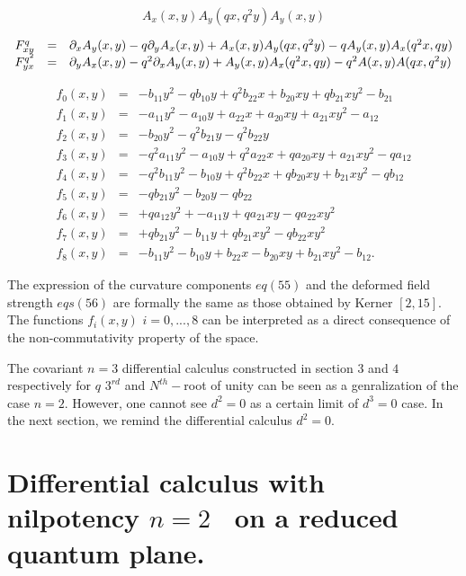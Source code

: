 \documentclass[a4paper,12pt,thmsa]{article}
\begin{document}
\[
A_x(x,y)A_y(qx,q^2y)A_y(x,y)
\]

\begin{equation}
\begin{array}{ccl}
F_{xy}^q &=&\partial _xA_y(x,y)-q\partial _yA_x(x,y)+
A_x(x,y)A_y(qx,q^2y)-qA_y(x,y)A_x(q^2x,qy) \cr
F_{yx}^{q^2}&=&\partial _yA_x(x,y)-q^2\partial _xA_y(x,y)+
A_y(x,y)A_x(q^2x,qy)-q^2A(x,y)A(qx,q^2y)  \cr
\end{array}
\end{equation}

\begin{eqnarray}
f_0(x,y) & =& -b_{11}y^2-qb_{10}y+q^2b_{22}x+b_{20}xy+qb_{21}xy^2-b_{21}
\nonumber \\
f_1(x,y)&=& -a_{11}y^2-a_{10}y+a_{22}x+a_{20}xy+a_{21}xy^2-a_{12}  \nonumber
\\
f_2(x,y)&=& -b_{20}y^2-q^2b_{21}y-q^2b_{22}y  \nonumber \\
f_3(x,y) & =& -q^2a_{11}y^2-a_{10}y+q^2a_{22}x+qa_{20}xy+a_{21}xy^2-qa_{12}
\nonumber \\
f_4(x,y) & =& -q^2b_{11}y^2-b_{10}y+q^2b_{22}x+qb_{20}xy+b_{21}xy^2-qb_{12}
\\
f_5(x,y) &=& -qb_{21}y^2-b_{20}y-qb_{22}  \nonumber \\
f_6(x,y) &=& +qa_{12}y^2+-a_{11}y+qa_{21}xy-qa_{22}xy^2  \nonumber \\
f_7(x,y) &=& +qb_{21}y^2-b_{11}y+qb_{21}xy^2-qb_{22}xy^2  \nonumber \\
f_8(x,y) &=& -b_{11}y^2-b_{10}y+b_{22}x-b_{20}xy+b_{21}xy^2-b_{12}.
\nonumber
\end{eqnarray}

The expression of the curvature components $eq(55)$ and the deformed field
strength $eqs(56)$ are formally the same as those obtained by Kerner $%
[2,15]. $ The functions $f_i(x,y)$ $i=0,...,8$ can be interpreted as a
direct consequence of the non-commutativity property of the space.

The covariant $n=3$ differential calculus constructed in section $3$ and $4$
respectively for $q$ $3^{rd}$ and $N^{th}-$root of unity can be seen as a
genralization of the case $n=2$. However, one cannot see $d^2=0$ as a
certain limit of $d^3=0$ case. In the next section, we remind the
differential calculus $d^2=0$.

\section{Differential calculus with nilpotency $n=2$ \ on a reduced quantum
plane.}
\end{document}
